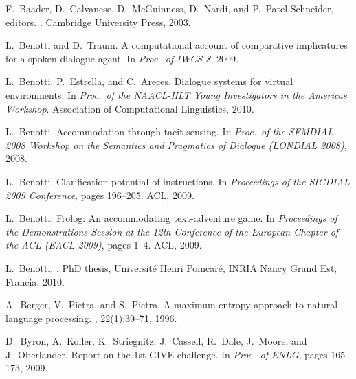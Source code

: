 \documentclass[11pt]{article}
\begin{document}
\begin{thebibliography}{}
F.~Baader, D.~Calvanese, D.~McGuinness, D.~Nardi, and P.~Patel-Schneider,
  editors.
. Cambridge University Press, 2003.

L.~Benotti and D.~Traum.
\newblock A computational account of comparative implicatures for a spoken
  dialogue agent.
\newblock In {\em Proc.\ of IWCS-8}, 2009.

L.~Benotti, P.~Estrella, and C.~Areces.
\newblock Dialogue systems for virtual environments.
\newblock In {\em Proc.\ of the NAACL-HLT Young Investigators in the Americas
  Workshop}. Association of Computational Linguistics, 2010.

L.~Benotti.
\newblock Accommodation through tacit sensing.
\newblock In {\em Proc.\ of the {SEMDIAL} 2008 Workshop on the Semantics and
  Pragmatics of Dialogue ({LONDIAL} 2008)}, 2008.

L.~Benotti.
\newblock Clarification potential of instructions.
\newblock In {\em Proceedings of the SIGDIAL 2009 Conference}, pages 196--205.
  ACL, 2009.

L.~Benotti.
\newblock Frolog: An accommodating text-adventure game.
\newblock In {\em Proceedings of the Demonstrations Session at the 12th
  Conference of the European Chapter of the ACL (EACL 2009)}, pages 1--4. ACL,
  2009.

L.~Benotti.
.
\newblock PhD thesis, Universit\'e Henri Poincar\'e, INRIA Nancy Grand Est,
  Francia, 2010.

A.~Berger, V.~Pietra, and S.~Pietra.
\newblock A maximum entropy approach to natural language processing.
, 22(1):39--71, 1996.

D.~Byron, A.~Koller, K.~Striegnitz, J.~Cassell, R.~Dale, J.~Moore, and
  J.~Oberlander.
\newblock Report on the {1}st {GIVE} challenge.
\newblock In {\em Proc.\ of ENLG}, pages 165--173, 2009.


\end{thebibliography}
\end{document}
